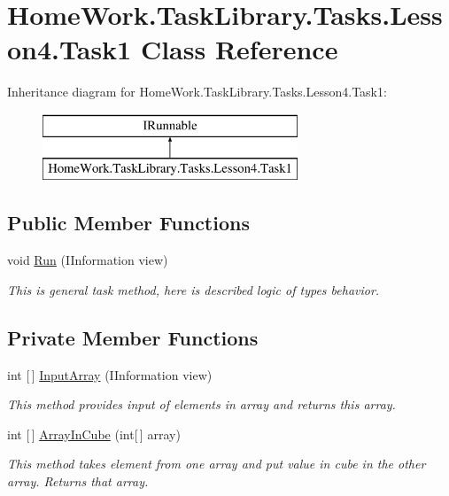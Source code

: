 \hypertarget{class_home_work_1_1_task_library_1_1_tasks_1_1_lesson4_1_1_task1}{}\section{Home\+Work.\+Task\+Library.\+Tasks.\+Lesson4.\+Task1 Class Reference}
\label{class_home_work_1_1_task_library_1_1_tasks_1_1_lesson4_1_1_task1}
Inheritance diagram for Home\+Work.\+Task\+Library.\+Tasks.\+Lesson4.\+Task1\+:\begin{figure}[H]
\begin{center}
\leavevmode
\includegraphics[height=2.000000cm]{class_home_work_1_1_task_library_1_1_tasks_1_1_lesson4_1_1_task1}
\end{center}
\end{figure}
\subsection*{Public Member Functions}
\begin{DoxyCompactItemize}
\item 
void \mbox{\hyperlink{class_home_work_1_1_task_library_1_1_tasks_1_1_lesson4_1_1_task1_a061067e43dd92337aa9914363a3289a1}{Run}} (I\+Information view)
\begin{DoxyCompactList}\small\item\em This is general task method, here is described logic of types behavior. \end{DoxyCompactList}\end{DoxyCompactItemize}
\subsection*{Private Member Functions}
\begin{DoxyCompactItemize}
\item 
int \mbox{[}$\,$\mbox{]} \mbox{\hyperlink{class_home_work_1_1_task_library_1_1_tasks_1_1_lesson4_1_1_task1_abfe0732e050f4679105d46c1ec3bb27a}{Input\+Array}} (I\+Information view)
\begin{DoxyCompactList}\small\item\em This method provides input of elements in array and returns this array. \end{DoxyCompactList}\item 
int \mbox{[}$\,$\mbox{]} \mbox{\hyperlink{class_home_work_1_1_task_library_1_1_tasks_1_1_lesson4_1_1_task1_a205b22e98ee24fcc596770e77a5df98b}{Array\+In\+Cube}} (int\mbox{[}$\,$\mbox{]} array)
\begin{DoxyCompactList}\small\item\em This method takes element from one array and put value in cube in the other array. Returns that array. \end{DoxyCompactList}\end{DoxyCompactItemize}


